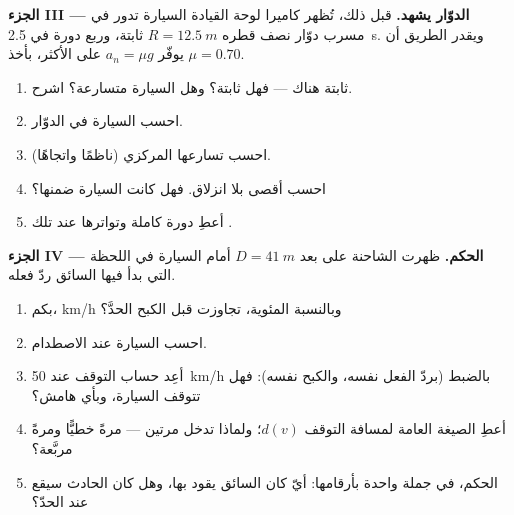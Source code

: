\begin{problem}
\medskip
\noindent\textbf{الجزء III --- الدوّار يشهد.}
قبل ذلك، تُظهر كاميرا لوحة القيادة السيارة تدور في مسرب دوّار
نصف قطره $R = \qty{12.5}{m}$  ثابتة، وربع دورة في
\qty{2.5}{s}. ويقدر الطريق أن يوفّر $a_n = \mu g$ على الأكثر، بأخذ
$\mu = 0.70$.
\begin{enumerate}[resume]
  \item {} ثابتة هناك --- فهل  ثابتة؟ وهل السيارة
        متسارعة؟ اشرح.
  \item احسب  السيارة في الدوّار.
  \item احسب تسارعها المركزي (ناظمًا واتجاهًا).
  \item احسب أقصى  بلا انزلاق. فهل كانت السيارة ضمنها؟
  \item أعطِ  دورة كاملة وتواترها عند تلك .
\end{enumerate}

\medskip
\noindent\textbf{الجزء IV --- الحكم.}
ظهرت الشاحنة على بعد $D = \qty{41}{m}$ أمام السيارة في اللحظة
التي بدأ فيها السائق ردّ فعله.
\begin{enumerate}[resume]
  \item بكم،  \unit{km/h} وبالنسبة المئوية، تجاوزت 
        قبل الكبح الحدَّ؟
  \item احسب  السيارة عند الاصطدام.
  \item أعِد حساب التوقف عند \qty{50}{km/h} بالضبط (بردّ الفعل نفسه،
        والكبح نفسه): فهل تتوقف السيارة، وبأي هامش؟
  \item أعطِ الصيغة العامة لمسافة التوقف $d(v)$؛ ولماذا تدخل
         مرتين --- مرةً خطيًّا ومرةً مربَّعة؟
  \item الحكم، في جملة واحدة بأرقامها: أيّ  كان
        السائق يقود بها، وهل كان الحادث سيقع عند الحدّ؟
\end{enumerate}
\end{problem}
